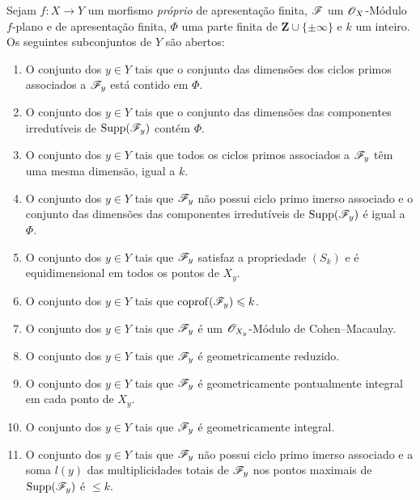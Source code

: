 \begin{theorem}[12.2.1]
\label{IV.12.2.1}
Sejam $f:X\to Y$ um morfismo \emph{próprio}
de apresentação finita, $\mathscr{F}$ um
$\mathscr{O}_X$-Módulo $f$-plano e de apresentação
finita, $\Phi$ uma parte finita de
$\mathbf{Z}\cup\{\pm\infty\}$ e $k$ um
inteiro. Os seguintes subconjuntos de $Y$
são abertos:
\begin{enumerate}[label=(\roman*)]
\item O conjunto dos $y\in Y$ tais que o
conjunto das dimensões dos ciclos primos
associados a $\mathscr{F}_y$ está contido em
$\Phi$.
\item O conjunto dos $y\in Y$ tais que o
conjunto das dimensões das componentes
irredutíveis de
$\operatorname{Supp}(\mathscr{F}_y)$ contém
$\Phi$.
\item O conjunto dos $y\in Y$ tais que
todos os ciclos primos associados a
$\mathscr{F}_y$ têm uma mesma dimensão,
igual a $k$.
\item O conjunto dos $y\in Y$ tais que
$\mathscr{F}_y$ não possui ciclo primo imerso
associado e o conjunto das dimensões
das componentes irredutíveis de
$\operatorname{Supp}(\mathscr{F}_y)$ é igual a
$\Phi$.
\item O conjunto dos $y\in Y$ tais que
$\mathscr{F}_y$ satisfaz a propriedade
$(S_k)$ e é equidimensional em todos
os pontos de $X_y$.
\item O conjunto dos $y\in Y$ tais que
$\operatorname{coprof}(\mathscr{F}_y)\leqslant k$.
\item O conjunto dos $y\in Y$ tais que
$\mathscr{F}_y$ é um
$\mathscr{O}_{X_y}$-Módulo de
Cohen--Macaulay.
\item O conjunto dos $y\in Y$ tais que
$\mathscr{F}_y$ é geometricamente reduzido.
\item O conjunto dos $y\in Y$ tais que
$\mathscr{F}_y$ é geometricamente
pontualmente integral em cada ponto
de $X_y$.
\item O conjunto dos $y\in Y$ tais que
$\mathscr{F}_y$ é geometricamente integral.
\item O conjunto dos $y\in Y$ tais que
$\mathscr{F}_y$ não possui ciclo primo
imerso associado e a soma $l(y)$ das
multiplicidades totais
 de $\mathscr{F}_y$ nos
pontos maximais de
$\operatorname{Supp}(\mathscr{F}_y)$ é
$\leq k$.
\end{enumerate}
\end{theorem}

